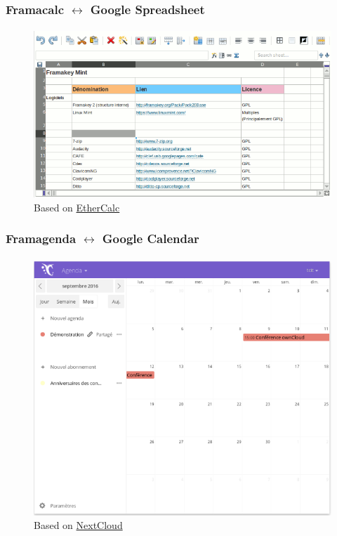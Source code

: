 \documentclass{beamer}
\begin{document}
	\begin{frame}
	\frametitle{Framacalc $\leftrightarrow$ Google Spreadsheet}
	\framesubtitle{}
	        \begin{figure}[h]
                \centering
                \includegraphics[width=.8\textwidth]{./images/framacalc}
		\caption{Based on \href{https://ethercalc.net}{EtherCalc}}
        	\end{figure}
	\end{frame}

	\begin{frame}
	\frametitle{Framagenda $\leftrightarrow$ Google Calendar}
	\framesubtitle{}
	        \begin{figure}[h]
                \centering
                \includegraphics[width=.8\textwidth]{./images/framagenda}
		\caption{Based on \href{https://nextcloud.com}{NextCloud}}
        	\end{figure}
	\end{frame}
\end{document}
